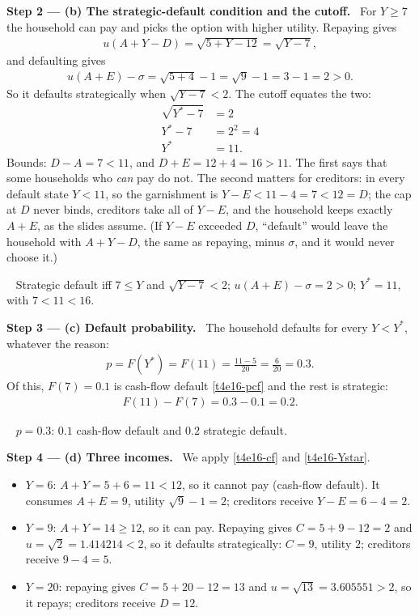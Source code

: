 \documentclass[11pt,a4paper]{article}
\newcommand{\step}[2]{\par\medskip\noindent\textbf{Step #1 --- #2.}~}
\newcommand{\answer}[1]{\par\smallskip\noindent\fbox{\textbf{Answer #1.}}~}
\begin{document}
\step{2}{(b) The strategic-default condition and the cutoff} For $Y\ge 7$ the household can pay and picks the
option with higher utility. Repaying gives
\begin{align}
  u(A+Y-D)=\sqrt{5+Y-12}=\sqrt{Y-7}, \label{t4e16-urep}
\end{align}
and defaulting gives
\begin{align}
  u(A+E)-\sigma = \sqrt{5+4}-1 = \sqrt 9 - 1 = 3-1 = 2 > 0. \label{t4e16-udef}
\end{align}
So it defaults strategically when $\sqrt{Y-7}<2$. The cutoff equates the two:
\begin{align}
  \sqrt{Y^*-7} &= 2 \nonumber\\
  Y^*-7 &= 2^2 = 4 \nonumber\\
  Y^* &= 11. \label{t4e16-Ystar}
\end{align}
Bounds: $D-A=7<11$, and $D+E=12+4=16>11$. The first says that some households who \emph{can} pay do not.
The second matters for creditors: in every default state $Y<11$, so the garnishment is
$Y-E<11-4=7<12=D$; the cap at $D$ never binds, creditors take all of $Y-E$, and the household keeps exactly
$A+E$, as the slides assume. (If $Y-E$ exceeded $D$, ``default'' would leave the household with $A+Y-D$, the
same as repaying, minus $\sigma$, and it would never choose it.)

\answer{(b)} Strategic default iff $7\le Y$ and $\sqrt{Y-7}<2$; $u(A+E)-\sigma=2>0$; $Y^*=11$, with $7<11<16$.

\step{3}{(c) Default probability} The household defaults for every $Y<Y^*$, whatever the reason:
\begin{align}
  p = F(Y^*) = F(11) = \frac{11-5}{20} = \frac{6}{20} = 0.3. \label{t4e16-p}
\end{align}
Of this, $F(7)=0.1$ is cash-flow default \eqref{t4e16-pcf} and the rest is strategic:
\begin{align}
  F(11)-F(7) = 0.3-0.1 = 0.2. \label{t4e16-pstr}
\end{align}

\answer{(c)} $p=0.3$: $0.1$ cash-flow default and $0.2$ strategic default.

\step{4}{(d) Three incomes} We apply \eqref{t4e16-cf} and \eqref{t4e16-Ystar}.
\begin{itemize}
  \item $Y=6$: $A+Y=5+6=11<12$, so it cannot pay (cash-flow default). It consumes $A+E=9$, utility
        $\sqrt9-1=2$; creditors receive $Y-E=6-4=2$.
  \item $Y=9$: $A+Y=14\ge 12$, so it can pay. Repaying gives $C=5+9-12=2$ and $u=\sqrt2=1.414214<2$, so it
        defaults strategically: $C=9$, utility $2$; creditors receive $9-4=5$.
  \item $Y=20$: repaying gives $C=5+20-12=13$ and $u=\sqrt{13}=3.605551>2$, so it repays; creditors receive $D=12$.
\end{itemize}
\end{document}
